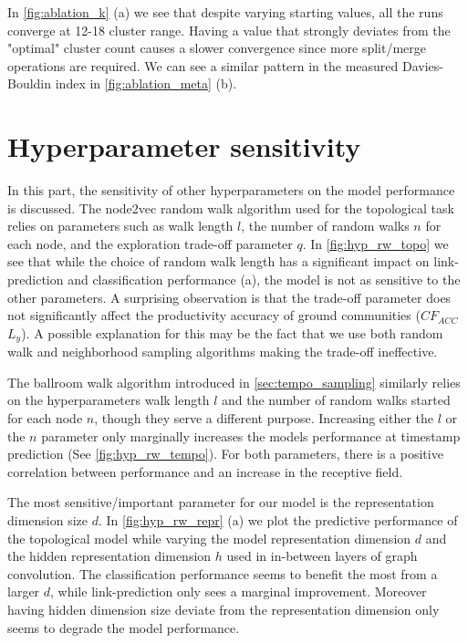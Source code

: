 

In \cref{fig:ablation_k} (a) we see that despite varying starting values, all the runs converge at 12-18 cluster range.
Having a value that strongly deviates from the "optimal" cluster count causes a slower convergence since more split/merge operations are required.
We can see a similar pattern in the measured Davies-Bouldin index in \cref{fig:ablation_meta} (b).

\section{Hyperparameter sensitivity} \label{sec:abl:hyperparam}


In this part, the sensitivity of other hyperparameters on the model performance is discussed.
%
The node2vec random walk algorithm used for the topological task relies on parameters such as walk length $l$, the number of random walks $n$ for each node, and the exploration trade-off parameter $q$.
In \cref{fig:hyp_rw_topo} we see that while the choice of random walk length has a significant impact on link-prediction and classification performance (a), the model is not as sensitive to the other parameters.
A surprising observation is that the trade-off parameter does not significantly affect the productivity accuracy of ground communities ($CF_{ACC}$ $L_y$).
A possible explanation for this may be the fact that we use both random walk and neighborhood sampling algorithms making the trade-off ineffective.



The ballroom walk algorithm introduced in \cref{sec:tempo_sampling} similarly relies on the hyperparameters walk length $l$ and the number of random walks started for each node $n$, though they serve a different purpose.
Increasing either the $l$ or the $n$ parameter only marginally increases the models performance at timestamp prediction (See \cref{fig:hyp_rw_tempo}).
For both parameters, there is a positive correlation between performance and an increase in the receptive field. 



The most sensitive/important parameter for our model is the representation dimension size $d$.
In \cref{fig:hyp_rw_repr} (a) we plot the predictive performance of the topological model while varying the model representation dimension $d$ and the hidden representation dimension $h$ used in in-between layers of graph convolution.
The classification performance seems to benefit the most from a larger $d$, while link-prediction only sees a marginal improvement.
Moreover having hidden dimension size deviate from the representation dimension only seems to degrade the model performance.

